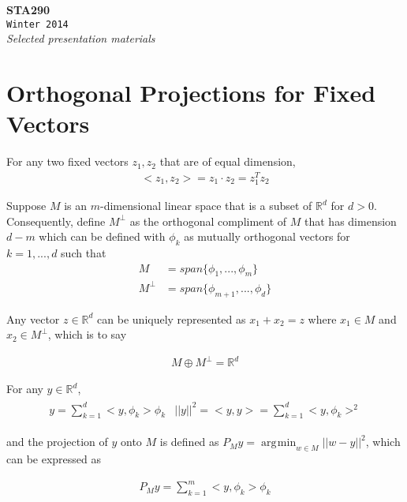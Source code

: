 \documentclass[a4paper, 11pt]{report}
\newcommand{\R}{\mathbb{R}}
\newcommand{\newchapter}[2]{
	\chapter{#1}
	\addtocontents{toc}{\vspace{.1in} \hspace{.25in} $\cdot$ #2 \par}
}
\DeclareMathOperator*{\argmin}{\arg\!\min}
\newcommand*{\titleTH}{\begingroup %
	\center
	\vspace*{\baselineskip} %
	\vspace{2.5in}
	{\Huge\bfseries STA290}\\[\baselineskip] %
	{\Huge\texttt{Winter 2014}}\\[\baselineskip] %
	{\Large \textit{Selected presentation materials}}\par %
	\vspace*{3\baselineskip} %
\endgroup}
\begin{document}
\titleTH %
\thispagestyle{empty}
\tableofcontents




\newchapter{Orthogonal Projections for Fixed Vectors}{2/13/14}


For any two fixed vectors $z_1,z_2$ that are of equal dimension,
\begin{align*}
	<z_1,z_2> = z_1\cdot z_2 = z_1^{T}z_2
\end{align*}

Suppose $M$ is an $m$-dimensional linear space that is a subset of $\R^d$ for $d > 0$. Consequently, define $M^{\perp}$ as the orthogonal compliment of $M$ that has dimension $d-m$ which can be defined with $\phi_k$ as mutually orthogonal vectors for $k = 1,...,d$ such that
\begin{align*}
	M &= span\{\phi_1,...,\phi_m\} \label{span} \\
	M^{\perp} & = span\{\phi_{m+1},...,\phi_d\} 
\end{align*}

Any vector $z \in \R^d$ can be uniquely represented as $x_1 + x_2 = z $ where $x_1 \in M$ and $x_2 \in M^{\perp}$, which is to say


\begin{align*}
	M \oplus M^{\perp} = \R^d
\end{align*}

\vspace{.1in}


For any $y \in \R^d$,
\begin{align*}
	\begin{split}
		y = \sum\limits_{k=1}^d <y, \phi_k>\phi_k
	\end{split}
	\begin{split}
		||y||^2 = <y,y> = \sum\limits_{k=1}^d <y, \phi_k>^2 
	\end{split}
\end{align*}

\vspace{.1in}

and the projection of $y$ onto $M$ is defined as 
$P_My = \argmin_{w \in M} ||w-y||^2 $, which can be expressed as

\begin{align}
\boxed{P_My = \sum\limits_{k=1}^m <y, \phi_k>\phi_k }
\end{align}
\end{document}
